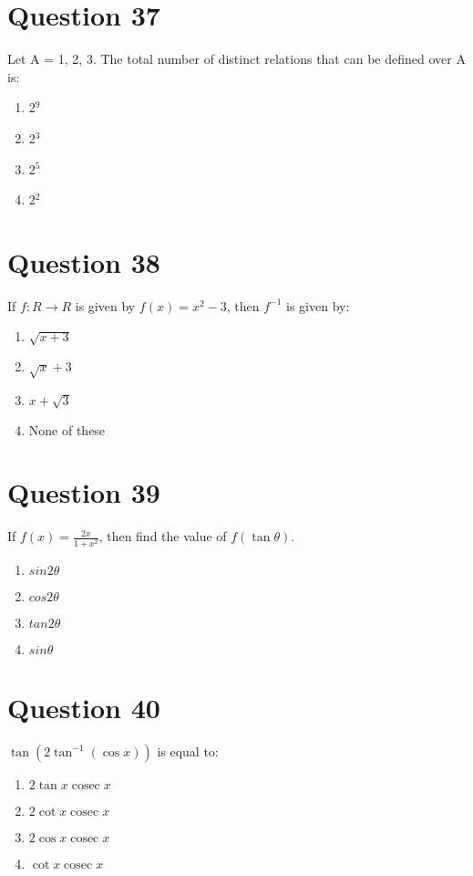 \documentclass{article}
\begin{document}
\section*{Question 37}
Let A = {1, 2, 3}. The total number of distinct relations that can be defined over A is:\newline
\begin{enumerate}[label=(\alph*)]
\item 2$^{9}$
\item 2$^{3}$
\item 2$^{5}$\newline
\item 2$^{2}$\newline
\end{enumerate}
\newpage
\section*{Question 38}
If \(f: R \rightarrow R\) is given by \(f(x)=x^2-3\), then \(f^{-1}\) is given by:\newline
\begin{enumerate}[label=(\alph*)]
\item \(\sqrt{x+3}\)
\item \(\sqrt{x}+3\)
\item \(x+\sqrt{3}\)
\item None of these
\end{enumerate}
\newpage
\section*{Question 39}
If \(f(x)=\frac{2 x}{1+x^{2}}\), then find the value of \(f(\tan \theta)\).
\begin{enumerate}[label=(\alph*)]
\item \(sin 2 \theta\)
\item \(cos 2 \theta\)
\item \(tan 2 \theta\)
\item \(sin \theta\)
\end{enumerate}
\newpage
\section*{Question 40}
\(\tan \left(2 \tan ^{-1}(\cos x)\right)\) is equal to:
\begin{enumerate}[label=(\alph*)]
\item \(2 \tan x \operatorname{cosec} x\)
\item \(2 \cot x \operatorname{cosec} x\)
\item \(2 \cos x \operatorname{cosec} x\)
\item \(\cot x \operatorname{cosec} x\)
\end{enumerate}
\newpage
\end{document}
